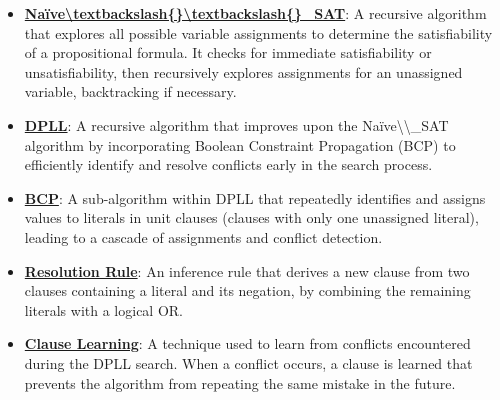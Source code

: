 \documentclass{article}%
\begin{document}
\begin{itemize}[leftmargin=*]%
\item \href{https://purdue.brightspace.com/d2l/common/assets/pdfjs-d2l-dist/1.0.14-legacy/web/viewer.html?file=\%2Fcontent\%2Fenforced\%2F1095467-wl.202510.CS.24300.001\%2F15L2-SAT.pdf\%3Fou\%3D1095467\&lang=en-us\&container=d2l-fileviewer-rendered-pdf\&fullscreen=d2l-fileviewer-rendered-pdf-dialog\&height=667#page=18}{\textbf{Naïve\textbackslash{}textbackslash\{\}\textbackslash{}textbackslash\{\}\_SAT}}: A recursive algorithm that explores all possible variable assignments to determine the satisfiability of a propositional formula. It checks for immediate satisfiability or unsatisfiability, then recursively explores assignments for an unassigned variable, backtracking if necessary.%
\item \href{https://purdue.brightspace.com/d2l/common/assets/pdfjs-d2l-dist/1.0.14-legacy/web/viewer.html?file=\%2Fcontent\%2Fenforced\%2F1095467-wl.202510.CS.24300.001\%2F15L2-SAT.pdf\%3Fou\%3D1095467\&lang=en-us\&container=d2l-fileviewer-rendered-pdf\&fullscreen=d2l-fileviewer-rendered-pdf-dialog\&height=667#page=17}{\textbf{DPLL}}: A recursive algorithm that improves upon the Naïve\textbackslash{}\textbackslash{}_SAT algorithm by incorporating Boolean Constraint Propagation (BCP) to efficiently identify and resolve conflicts early in the search process.%
\item \href{https://purdue.brightspace.com/d2l/common/assets/pdfjs-d2l-dist/1.0.14-legacy/web/viewer.html?file=\%2Fcontent\%2Fenforced\%2F1095467-wl.202510.CS.24300.001\%2F15L2-SAT.pdf\%3Fou\%3D1095467\&lang=en-us\&container=d2l-fileviewer-rendered-pdf\&fullscreen=d2l-fileviewer-rendered-pdf-dialog\&height=667#page=20}{\textbf{BCP}}: A sub-algorithm within DPLL that repeatedly identifies and assigns values to literals in unit clauses (clauses with only one unassigned literal), leading to a cascade of assignments and conflict detection.%
\item \href{https://purdue.brightspace.com/d2l/common/assets/pdfjs-d2l-dist/1.0.14-legacy/web/viewer.html?file=\%2Fcontent\%2Fenforced\%2F1095467-wl.202510.CS.24300.001\%2F15L2-SAT.pdf\%3Fou\%3D1095467\&lang=en-us\&container=d2l-fileviewer-rendered-pdf\&fullscreen=d2l-fileviewer-rendered-pdf-dialog\&height=667#page=32}{\textbf{Resolution Rule}}: An inference rule that derives a new clause from two clauses containing a literal and its negation, by combining the remaining literals with a logical OR.%
\item \href{https://purdue.brightspace.com/d2l/common/assets/pdfjs-d2l-dist/1.0.14-legacy/web/viewer.html?file=\%2Fcontent\%2Fenforced\%2F1095467-wl.202510.CS.24300.001\%2F15L2-SAT.pdf\%3Fou\%3D1095467\&lang=en-us\&container=d2l-fileviewer-rendered-pdf\&fullscreen=d2l-fileviewer-rendered-pdf-dialog\&height=667#page=35}{\textbf{Clause Learning}}: A technique used to learn from conflicts encountered during the DPLL search. When a conflict occurs, a clause is learned that prevents the algorithm from repeating the same mistake in the future.%

\end{itemize}
\end{document}
